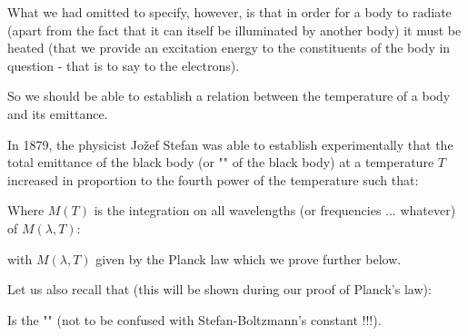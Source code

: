 	What we had omitted to specify, however, is that in order for a body to radiate (apart from the fact that it can itself be illuminated by another body) it must be heated (that we provide an excitation energy to the constituents of the body in question - that is to say to the electrons).

	So we should be able to establish a relation between the temperature of a body and its emittance.

	In 1879, the physicist Jožef Stefan was able to establish experimentally that the total emittance of the black body (or "" of the black body) at a temperature $T$ increased in proportion to the fourth power of the temperature such that:
	
	Where $M (T)$ is the integration on all wavelengths (or frequencies ... whatever) of $M(\lambda,T)$:
	
	with $M(\lambda,T)$ given by the Planck law which we prove further below.

	Let us also recall that (this will be shown during our proof of Planck's law):
	
	Is the "" (not to be confused with Stefan-Boltzmann's constant !!!).
	
